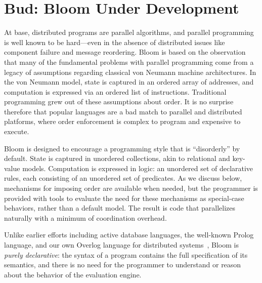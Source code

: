 \section{Bud: Bloom Under Development}
\label{sec:lang}
At base, distributed programs are parallel algorithms, and parallel programming is well known to be hard---even in the absence of distributed issues like component failure and message reordering.  Bloom is based on the observation that many of the fundamental problems with parallel programming come from a legacy of assumptions regarding classical von Neumann machine architectures.  In the von Neumann model, state is captured in an ordered array of addresses, and computation is expressed via an ordered list of instructions.  Traditional programming grew out of these assumptions about order.  It is no surprise therefore that popular languages are a bad match to parallel and distributed platforms, where order enforcement is complex to program and expensive to execute.

Bloom is designed to encourage a programming style that is ``disorderly'' by default.  State is captured in unordered collections, akin to relational and key-value models.  Computation is expressed in logic: an unordered set of declarative rules, each consisting of an unordered set of predicates.  As we discuss below, mechanisms for imposing order are available when needed, but the programmer is provided with tools to evaluate the need for these mechanisms as special-case behaviors, rather than a default model.  The result is code that parallelizes naturally with a minimum of coordination overhead.

 
Unlike earlier efforts including active database languages, the well-known Prolog language, and our own Overlog language for distributed systems~\cite{p2}, Bloom is {\em purely declarative}: the syntax of a program contains the full specification of its semantics, and there is no need for the programmer to understand or reason about the behavior of the evaluation engine.  

